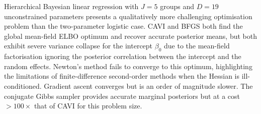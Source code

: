 \documentclass[11pt,a4paper]{article}
\begin{document}
Hierarchical Bayesian linear regression with $J=5$ groups and $D=19$ unconstrained
parameters presents a qualitatively more challenging optimisation problem than the
two-parameter logistic case.
CAVI and BFGS both find the global mean-field ELBO optimum and recover accurate
posterior means, but both exhibit severe variance collapse for the intercept $\beta_0$
due to the mean-field factorisation ignoring the posterior correlation between the
intercept and the random effects.
Newton's method fails to converge to this optimum, highlighting the limitations of
finite-difference second-order methods when the Hessian is ill-conditioned.
Gradient ascent converges but is an order of magnitude slower.
The conjugate Gibbs sampler provides accurate marginal posteriors but at a cost
$>100\times$ that of CAVI for this problem size.

\printbibliography
\end{document}
